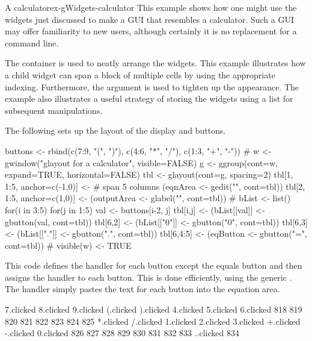 \begin{example}{A calculator}{ex-gWidgets-calculator}
This example shows how one might use the widgets just
discussed to make a GUI that resembles a calculator. Such a GUI may offer
familiarity to new \R\/ users, although certainly it is no replacement
for a command line.

The  container is used to neatly arrange the
widgets. This example illustrates how a child widget can span a block
of multiple cells by using the appropriate indexing. Furthermore, the
 argument is used to tighten up the appearance. The
example also illustrates a useful strategy of storing the widgets
using a list for subsequent manipulations.

The following sets up the layout of the display and buttons.
\begin{Schunk}
\begin{Sinput}
 buttons <- rbind(c(7:9, "(", ")"),
                  c(4:6, "*", "/"),
                  c(1:3, "+", "-"))
 #
 w <- gwindow("glayout for a calculator", visible=FALSE)
 g <- ggroup(cont=w, expand=TRUE, horizontal=FALSE)
 tbl <- glayout(cont=g, spacing=2)
 tbl[1, 1:5, anchor=c(-1,0)] <-          # span 5 columns
   (eqnArea <- gedit("", cont=tbl))
 tbl[2, 1:5, anchor=c(1,0)] <- 
   (outputArea <- glabel("", cont=tbl))
 #
 bList <- list()
 for(i in 3:5) {
   for(j in 1:5) {
     val <- buttons[i-2, j]
     tbl[i,j] <- (bList[[val]] <- gbutton(val, cont=tbl))
   }
 }
 tbl[6,2] <- (bList[["0"]] <- gbutton("0", cont=tbl))
 tbl[6,3] <- (bList[["."]] <- gbutton(".", cont=tbl))
 tbl[6,4:5] <- (eqButton <- gbutton("=", cont=tbl))
 #
 visible(w) <- TRUE
\end{Sinput}
\end{Schunk}

This code defines the handler for each button except the equals button
and then assigns the handler to each button. This is done efficiently,
using the generic . The handler simply pastes
the text for each button into the equation area.

\begin{Schunk}
\begin{Soutput}
7.clicked 8.clicked 9.clicked (.clicked ).clicked 4.clicked 5.clicked 6.clicked 
      818       819       820       821       822       823       824       825 
*.clicked /.clicked 1.clicked 2.clicked 3.clicked +.clicked -.clicked 0.clicked 
      826       827       828       829       830       831       832       833 
..clicked 
      834 
\end{Soutput}
\end{Schunk}


\end{example}
